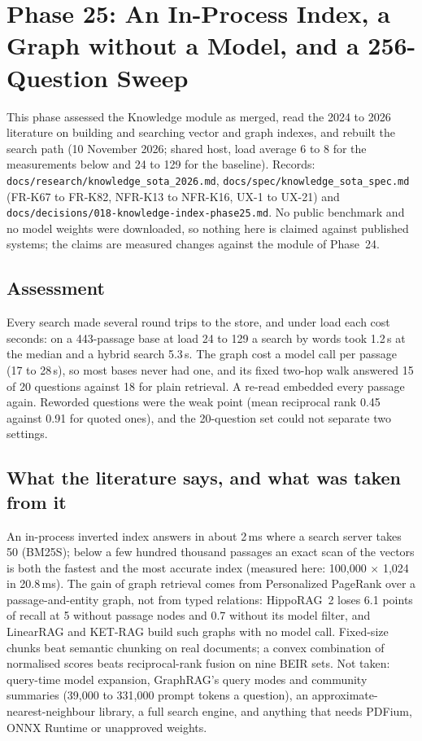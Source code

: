 \section{Phase 25: An In-Process Index, a Graph without a Model, and a 256-Question Sweep}
\label{sec:phase25}

This phase assessed the Knowledge module as merged, read the 2024 to 2026 literature on building and searching vector and graph indexes, and rebuilt the search path
(10 November 2026; shared host, load average 6 to 8 for the measurements below and 24 to 129 for the baseline). Records:
\texttt{docs/research/knowledge\_sota\_2026.md}, \texttt{docs/spec/knowledge\_sota\_spec.md} (FR-K67 to FR-K82, NFR-K13 to NFR-K16, UX-1 to UX-21) and
\texttt{docs/decisions/018-knowledge-index-phase25.md}. No public benchmark and no model weights were downloaded, so nothing here is claimed against published
systems; the claims are measured changes against the module of Phase~24.

\subsection{Assessment}

Every search made several round trips to the store, and under load each cost seconds: on a 443-passage base at load 24 to 129 a search by words took 1.2\,s at
the median and a hybrid search 5.3\,s. The graph cost a model call per passage (17 to 28\,s), so most bases never had one, and its fixed two-hop walk answered 15 of
20 questions against 18 for plain retrieval. A re-read embedded every passage again. Reworded questions were the weak point (mean reciprocal rank 0.45 against 0.91
for quoted ones), and the 20-question set could not separate two settings.

\subsection{What the literature says, and what was taken from it}

An in-process inverted index answers in about 2\,ms where a search server takes 50 (BM25S); below a few hundred thousand passages an exact scan of the vectors is
both the fastest and the most accurate index (measured here: 100{,}000 $\times$ 1{,}024 in 20.8\,ms). The gain of graph retrieval comes from Personalized PageRank
over a passage-and-entity graph, not from typed relations: HippoRAG~2 loses 6.1 points of recall at 5 without passage nodes and 0.7 without its model filter, and
LinearRAG and KET-RAG build such graphs with no model call. Fixed-size chunks beat semantic chunking on real documents; a convex combination of normalised scores
beats reciprocal-rank fusion on nine BEIR sets. Not taken: query-time model expansion, GraphRAG's query modes and community summaries (39{,}000 to 331{,}000
prompt tokens a question), an approximate-nearest-neighbour library, a full search engine, and anything that needs PDFium, ONNX Runtime or unapproved weights.

